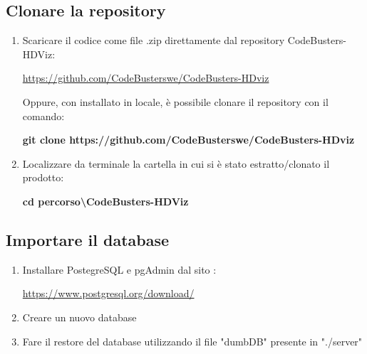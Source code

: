 \subsection{Clonare la repository}
\begin{enumerate}
	\item Scaricare il codice come file .zip direttamente dal repository CodeBusters-HDViz:
		\begin{center}
			\textcolor{blue}{\url{https://github.com/CodeBusterswe/CodeBusters-HDviz}}
		\end{center}	
	Oppure, con  installato in locale, è possibile clonare il repository con il comando:
		\begin{center}
			\textcolor{coloreRosso}{\textbf{git clone https://github.com/CodeBusterswe/CodeBusters-HDviz}}
		\end{center}
      
	\item Localizzare da terminale la cartella in cui si è stato estratto/clonato il prodotto:  
		\begin{center}
			\textcolor{coloreRosso}{\textbf{cd percorso\textbackslash CodeBusters-HDViz}}
 		\end{center}
\end{enumerate}
\subsection{Importare il database}
\begin{enumerate}
\item Installare PostegreSQL e pgAdmin dal sito :
	\begin{center}
			\textcolor{blue}{\url{https://www.postgresql.org/download/}}
	\end{center}	
\item Creare un nuovo database
\item Fare il restore del database utilizzando il file "dumbDB" presente in "./server"
\end{enumerate}
